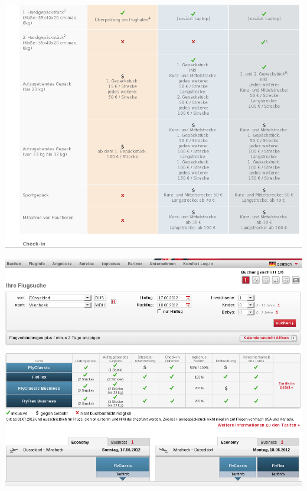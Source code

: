 \documentclass[11pt]{article}
\begin{document}
\includegraphics[scale=0.45]{Flug_Air_Berlin/Bildschirmfoto_am_2012-06-13_14_47_26.png} 

\includegraphics[scale=0.45]{Flug_Air_Berlin/Bildschirmfoto_am_2012-06-13_14_47_43.png} 
\end{document}
